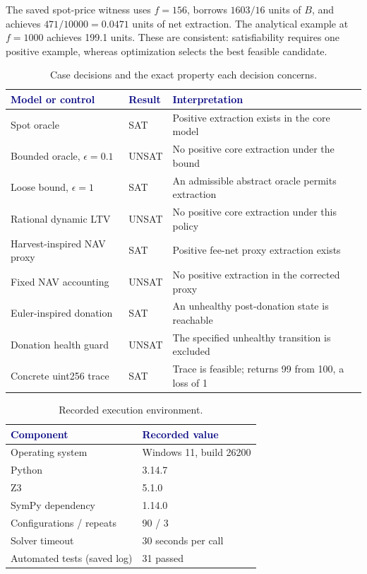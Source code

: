 \documentclass[conference]{IEEEtran}
\begin{document}
The saved spot-price witness uses $f=156$, borrows $1603/16$ units of $B$,
and achieves $471/10000=0.0471$ units of net extraction. The analytical example
at $f=1000$ achieves 199.1 units. These are consistent: satisfiability requires
one positive example, whereas optimization selects the best feasible candidate.

\begin{table}[t]\centering
\caption{Case decisions and the exact property each decision concerns.}
\begin{tabular}{lll}\toprule
\textcolor{Navy}{Model or control} & \textcolor{Navy}{Result} & \textcolor{Navy}{Interpretation}\\\midrule
Spot oracle & SAT & Positive extraction exists in the core model\\
Bounded oracle, $\epsilon=0.1$ & UNSAT & No positive core extraction under the bound\\
Loose bound, $\epsilon=1$ & SAT & An admissible abstract oracle permits extraction\\
Rational dynamic LTV & UNSAT & No positive core extraction under this policy\\
Harvest-inspired NAV proxy & SAT & Positive fee-net proxy extraction exists\\
Fixed NAV accounting & UNSAT & No positive extraction in the corrected proxy\\
Euler-inspired donation & SAT & An unhealthy post-donation state is reachable\\
Donation health guard & UNSAT & The specified unhealthy transition is excluded\\
Concrete uint256 trace & SAT & Trace is feasible; returns 99 from 100, a loss of 1\\
\bottomrule\end{tabular}\end{table}

\begin{table}[t]\centering\caption{Recorded execution environment.}
\begin{tabular}{ll}\toprule
\textcolor{Navy}{Component} & \textcolor{Navy}{Recorded value}\\\midrule
Operating system & Windows 11, build 26200\\
Python & 3.14.7\\
Z3 & 5.1.0\\
SymPy dependency & 1.14.0\\
Configurations / repeats & 90 / 3\\
Solver timeout & 30 seconds per call\\
Automated tests (saved log) & 31 passed\\
\bottomrule\end{tabular}\end{table}
\end{document}
